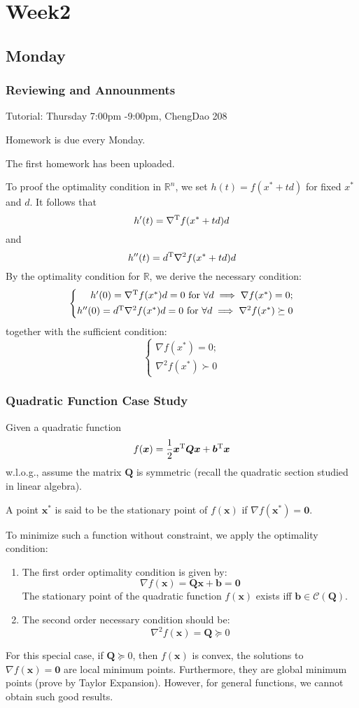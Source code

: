 
\chapter{Week2}
\section{Monday}
\subsection{Reviewing and Announments}
Tutorial: Thursday 7:00pm -9:00pm, ChengDao 208

Homework is due every Monday.

The first homework has been uploaded.

To proof the optimality condition in $\mathbb{R}^n$, we set $h(t) = f(x^*+td)$ for fixed $x^*$ and $d$. It follows that
\[
h'(t)=\nabla^{\mathrm T} f(x^*+td)d
\]
and
\[
h''(t)=d^{\mathrm T}\nabla^2f(x^*+td)d
\]
By the optimality condition for $\mathbb{R}$, we derive the necessary condition:
\[
\left\{
\begin{aligned}
\mbox{$h'(0)=\nabla^{\mathrm T} f(x^*)d=0$ for $\forall d$}\implies \mbox{$\nabla f(x^*)=0$;}\\
\mbox{$h''(0)=d^{\mathrm T}\nabla^2f(x^*)d=0$ for $\forall d$}
\implies
\mbox{$\nabla^2f(x^*)\succeq0$}
\end{aligned}
\right.
\]
together with the sufficient condition:
\[
\left\{
\begin{aligned}
\mbox{$\nabla f(x^*)=0$;}\\
\mbox{$\nabla^2f(x^*)\succ0$}
\end{aligned}
\right.
\]
\subsection{Quadratic Function Case Study}
Given a quadratic function 
\[
f(\bm x) =\frac{1}{2}\bm x^{\mathrm T}\bm Q\bm x+\bm b^{\mathrm T}\bm x
\]
w.l.o.g., assume the matrix $\bm Q$ is symmetric (recall the quadratic section studied in linear algebra).


\begin{definition}[Stationarity]
A point $\bm x^*$ is said to be the stationary point of $f(\bm x)$ if $\nabla f(\bm x^*)=\bm0$.
\end{definition}
To minimize such a function without constraint, we apply the optimality condition:
\begin{enumerate}
\item
The first order optimality condition is given by:
\[
\nabla f(\bm x) = \bm Q\bm x+\bm b=\bm0
\]
The stationary point of the quadratic function $f(\bm x)$ exists iff $\bm b\in\mathcal{C}(\bm Q).$
\item
The second order necessary condition should be:
\[
\nabla^2 f(\bm x)=\bm Q\succeq0
\]
\end{enumerate}
For this special case, if $\bm Q\succeq0$, then $f(\bm x)$ is convex, the solutions to $\nabla f(\bm x) =\bm0$ are local minimum points. Furthermore, they are global minimum points (prove by Taylor Expansion). However, for general functions, we cannot obtain such good results.

